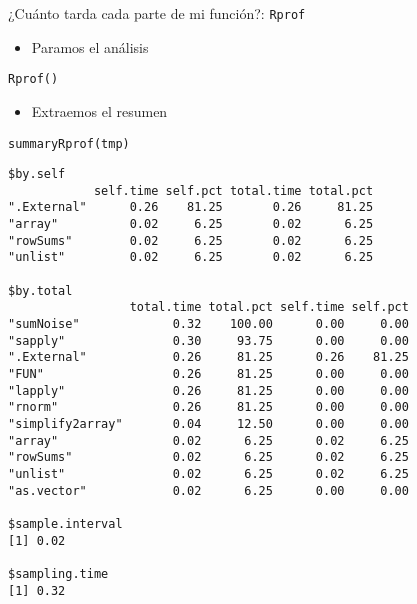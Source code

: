 \documentclass[xcolor={usenames,svgnames,dvipsnames}]{beamer}
\begin{document}
\begin{frame}[fragile,label=sec-3-7]{¿Cuánto tarda cada parte de mi función?: \texttt{Rprof}}
 \begin{itemize}
\item Paramos el análisis
\end{itemize}
\lstset{language=R,numbers=none}
\begin{lstlisting}
Rprof()
\end{lstlisting}

\begin{itemize}
\item Extraemos el resumen
\end{itemize}
\lstset{language=R,numbers=none}
\begin{lstlisting}
summaryRprof(tmp)
\end{lstlisting}

\begin{verbatim}
$by.self
            self.time self.pct total.time total.pct
".External"      0.26    81.25       0.26     81.25
"array"          0.02     6.25       0.02      6.25
"rowSums"        0.02     6.25       0.02      6.25
"unlist"         0.02     6.25       0.02      6.25

$by.total
                 total.time total.pct self.time self.pct
"sumNoise"             0.32    100.00      0.00     0.00
"sapply"               0.30     93.75      0.00     0.00
".External"            0.26     81.25      0.26    81.25
"FUN"                  0.26     81.25      0.00     0.00
"lapply"               0.26     81.25      0.00     0.00
"rnorm"                0.26     81.25      0.00     0.00
"simplify2array"       0.04     12.50      0.00     0.00
"array"                0.02      6.25      0.02     6.25
"rowSums"              0.02      6.25      0.02     6.25
"unlist"               0.02      6.25      0.02     6.25
"as.vector"            0.02      6.25      0.00     0.00

$sample.interval
[1] 0.02

$sampling.time
[1] 0.32
\end{verbatim}
\end{frame}
\end{document}
